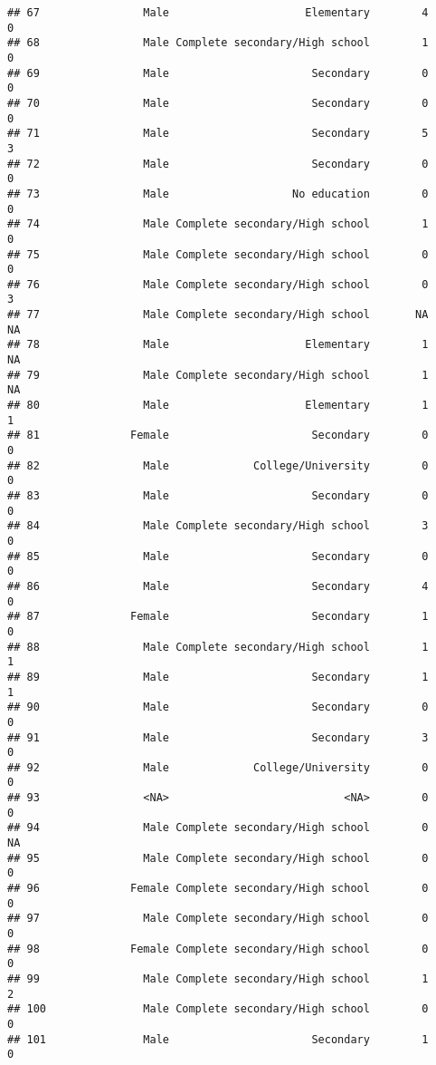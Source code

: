 \documentclass[
]{article}
\begin{document}
\begin{verbatim}
## 67                Male                     Elementary        4        0
## 68                Male Complete secondary/High school        1        0
## 69                Male                      Secondary        0        0
## 70                Male                      Secondary        0        0
## 71                Male                      Secondary        5        3
## 72                Male                      Secondary        0        0
## 73                Male                   No education        0        0
## 74                Male Complete secondary/High school        1        0
## 75                Male Complete secondary/High school        0        0
## 76                Male Complete secondary/High school        0        3
## 77                Male Complete secondary/High school       NA       NA
## 78                Male                     Elementary        1       NA
## 79                Male Complete secondary/High school        1       NA
## 80                Male                     Elementary        1        1
## 81              Female                      Secondary        0        0
## 82                Male             College/University        0        0
## 83                Male                      Secondary        0        0
## 84                Male Complete secondary/High school        3        0
## 85                Male                      Secondary        0        0
## 86                Male                      Secondary        4        0
## 87              Female                      Secondary        1        0
## 88                Male Complete secondary/High school        1        1
## 89                Male                      Secondary        1        1
## 90                Male                      Secondary        0        0
## 91                Male                      Secondary        3        0
## 92                Male             College/University        0        0
## 93                <NA>                           <NA>        0        0
## 94                Male Complete secondary/High school        0       NA
## 95                Male Complete secondary/High school        0        0
## 96              Female Complete secondary/High school        0        0
## 97                Male Complete secondary/High school        0        0
## 98              Female Complete secondary/High school        0        0
## 99                Male Complete secondary/High school        1        2
## 100               Male Complete secondary/High school        0        0
## 101               Male                      Secondary        1        0

\end{verbatim}
\end{document}
